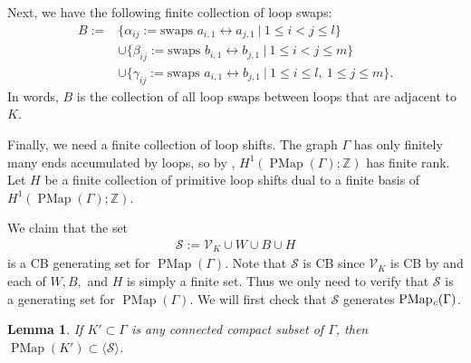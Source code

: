 \documentclass[11pt]{amsart}
\theoremstyle{plain}
\newtheorem{LEM}[THM]{Lemma}
\theoremstyle{definition}
\DeclareMathOperator{\PMap}{PMap}
\DeclareMathOperator{\PMapc}{PMap_{\it c}}
\newcommand{\Z}{\mathbb{Z}}
\newcommand{\cV}{\mathcal{V}}
\newcommand{\cS}{\mathcal{S}}
\def\G{{\Gamma}}
\newcommand{\defeq}{:=}
\newcommand{\la}{\langle}
\newcommand{\ra}{\rangle}
\newcommand{\<}{\langle}
\renewcommand{\>}{\rangle}
\begin{document}
Next, we have the following finite collection of loop swaps:
\begin{align*}
    B \defeq &\{\alpha_{ij}:=\text{swaps } a_{i,1} \leftrightarrow a_{j,1}\ |\ 1 \le i < j \le l\}\\
        &\cup\{\beta_{ij}:= \text{swaps } b_{i,1} \leftrightarrow b_{j,1}\ |\ 1 \le i < j \le m \}\\
        &\cup\{\gamma_{ij}:= \text{swaps } a_{i,1} \leftrightarrow b_{j,1}\ |\ 1 \le i \le l,\ 1\le j \le m\}. 
\end{align*}
In words, $B$ is the collection of all loop swaps between loops that are adjacent to $K$. 

Finally, we need a finite collection of loop shifts. The graph $\G$ has only finitely many ends accumulated by loops, so by , $H^{1}(\PMap(\G);\Z)$ has finite rank. Let $H$ be a finite collection of primitive loop shifts dual to a finite basis of $H^{1}(\PMap(\G);\Z)$.

We claim that the set 
\begin{align*}
    \cS := \cV_{K} \cup W \cup B \cup H
\end{align*}
is a CB generating set for $\PMap(\G)$. Note that $\cS$ is CB since $\cV_{K}$ is CB by  and each of $W,B,$ and $H$ is simply a finite set. Thus we only need to verify that $\cS$ is a generating set for $\PMap(\G)$. We will first check that $\cS$ generates $\PMapc(\G)$. 

\begin{LEM}\label{lem:compactcbgen}
    If $K' \subset \G$ is any connected compact subset of $\G$, then $\PMap(K') \subset \la \cS \ra$.  
\end{LEM}
\end{document}
